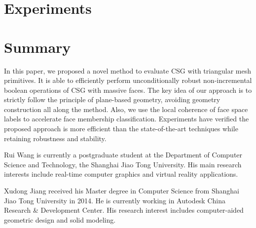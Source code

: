 \documentclass[10pt,journal,compsoc]{IEEEtran}
\begin{document}

\section{Experiments}

\section{Summary}

In this paper, we proposed a novel method to evaluate CSG with triangular mesh primitives. It is able to efficiently perform unconditionally robust non-incremental boolean operations of CSG with massive faces. The key idea of our approach is to strictly follow the principle of plane-based geometry, avoiding geometry construction all along the method. Also, we use the local coherence of face space labels to accelerate face membership classification. Experiments have verified the proposed approach is more efficient than the state-of-the-art techniques while retaining robustness and stability.



\appendices







\begin{IEEEbiography}{Rui Wang}
is currently a postgraduate student at the Department of Computer Science and Technology, the Shanghai Jiao Tong University. His main research interests include real-time computer graphics and virtual reality applications.
\end{IEEEbiography}

\begin{IEEEbiography}{Xudong Jiang}
received his Master degree in Computer Science from Shanghai Jiao Tong University in 2014. He is currently working in Autodesk China Research \& Development Center. His research interest includes computer-aided geometric design and solid modeling.
\end{IEEEbiography}
\end{document}
